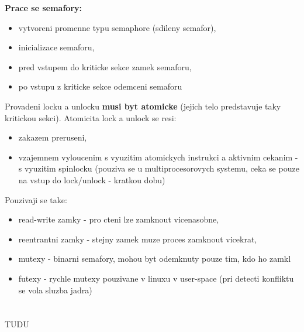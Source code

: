 \documentclass[a4paper, 11pt]{article}
\begin{document}
\textbf{Prace se semafory:}
\begin{itemize}
    \item vytvoreni promenne typu semaphore (sdileny semafor),
    \item inicializace semaforu,
    \item pred vstupem do kriticke sekce zamek semaforu,
    \item po vstupu z kriticke sekce odemceni semaforu \\
\end{itemize}

Provadeni locku a unlocku \textbf{musi byt atomicke} (jejich telo predstavuje taky kritickou sekci). Atomicita lock a unlock se resi:
\begin{itemize}
    \item zakazem preruseni,
    \item vzajemnem vyloucenim s vyuzitim atomickych instrukci a aktivnim cekanim - s vyuzitim spinlocku (pouziva se u multiprocesorovych systemu, ceka se pouze na vstup do lock/unlock - kratkou dobu) \\
\end{itemize}

\newpage

Pouzivaji se take:
\begin{itemize}
    \item read-write zamky - pro cteni lze zamknout vicenasobne,
    \item reentrantni zamky - stejny zamek muze proces zamknout vicekrat,
    \item mutexy - binarni semafory, mohou byt odemknuty pouze tim, kdo ho zamkl
    \item futexy - rychle mutexy pouzivane v linuxu v user-space (pri detecti konfliktu se vola sluzba jadra) \\
\end{itemize}

\newpage
\section{}
TUDU
\end{document}
